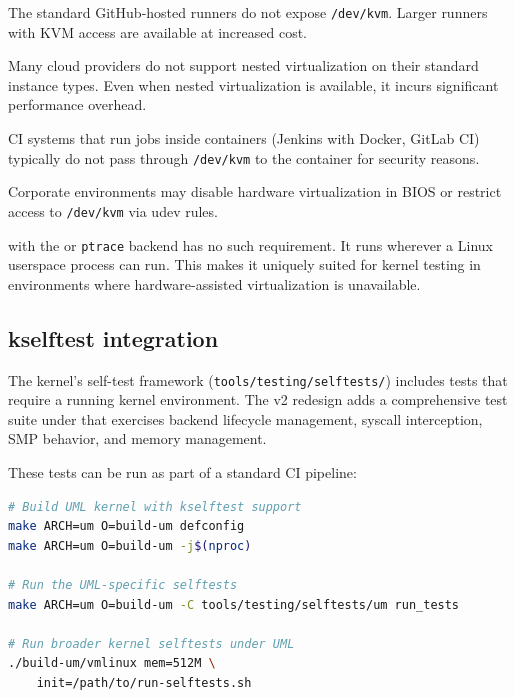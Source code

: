\begin{description}[style=nextline,leftmargin=2em]
  \item[GitHub Actions (default runners).]
    The standard GitHub-hosted runners do not expose \texttt{/dev/kvm}.
    Larger runners with KVM access are available at increased cost.
  \item[Shared cloud instances.]
    Many cloud providers do not support nested virtualization on their
    standard instance types.  Even when nested virtualization is
    available, it incurs significant performance overhead.
  \item[Containerized CI.]
    CI systems that run jobs inside containers (Jenkins with Docker,
    GitLab CI) typically do not pass through \texttt{/dev/kvm} to
    the container for security reasons.
  \item[Locked-down workstations.]
    Corporate environments may disable hardware virtualization in BIOS
    or restrict access to \texttt{/dev/kvm} via udev rules.
\end{description}

\UML{} with the \Seccomp{} or \texttt{ptrace} backend has no such
requirement.  It runs wherever a Linux userspace process can run.
This makes it uniquely suited for kernel testing in environments where
hardware-assisted virtualization is unavailable.

\subsection{kselftest integration}

The kernel's self-test framework (\texttt{tools/testing/selftests/})
includes tests that require a running kernel environment.  The v2
redesign adds a comprehensive test suite under
 that exercises backend lifecycle
management, syscall interception, SMP behavior, and memory management.

These tests can be run as part of a standard CI pipeline:

\begin{lstlisting}[language=bash,caption={Running kselftest under UML in CI}]
# Build UML kernel with kselftest support
make ARCH=um O=build-um defconfig
make ARCH=um O=build-um -j$(nproc)

# Run the UML-specific selftests
make ARCH=um O=build-um -C tools/testing/selftests/um run_tests

# Run broader kernel selftests under UML
./build-um/vmlinux mem=512M \
    init=/path/to/run-selftests.sh
\end{lstlisting}

